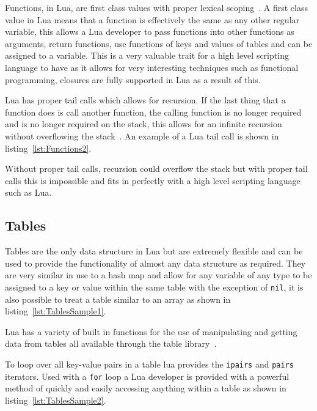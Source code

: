 \documentclass[11pt,a4paper,titlepage]{report}
\begin{document}
	Functions, in Lua, are first class values with proper lexical scoping~\cite{Ierusalimschy:2013:PLT:2502646}. A first class value in Lua means that a function is effectively the same as any other regular variable, this allows a Lua developer to pass functions into other functions as arguments, return functions, use functions of keys and values of tables and can be assigned to a variable. This is a very valuable trait for a high level scripting language to have as it allows for very interesting techniques such as functional programming, closures are fully supported in Lua as a result of this.

	Lua has proper tail calls which allows for recursion. If the last thing that a function does is call another function, the calling function is no longer required and is no longer required on the stack, this allows for an infinite recursion without overflowing the stack~\cite{Ierusalimschy:2013:PLT:2502646}. An example of a Lua tail call is shown in listing~\ref{lst:Functions2}.

	\singlespacing
	
	\onehalfspacing


	Without proper tail calls, recursion could overflow the stack but with proper tail calls this is impossible and fits in perfectly with a high level scripting language such as Lua.

\subsection{Tables}
	Tables are the only data structure in Lua but are extremely flexible and can be used to provide the functionality of almost any data structure as required. They are very similar in use to a hash map and allow for any variable of any type to be assigned to a key or value within the same table with the exception of \texttt{nil}, it is also possible to treat a table similar to an array as shown in listing~\ref{lst:TablesSample1}.

	\singlespacing
	
	\onehalfspacing


	Lua has a variety of built in functions for the use of manipulating and getting data from tables all available through the table library~\cite{LuaMan}.

	To loop over all key-value pairs in a table lua provides the \texttt{ipairs} and \texttt{pairs} iterators. Used with a \texttt{for} loop a Lua developer is provided with a powerful method of quickly and easily accessing anything within a table as shown in listing~\ref{lst:TablesSample2}.
\end{document}
